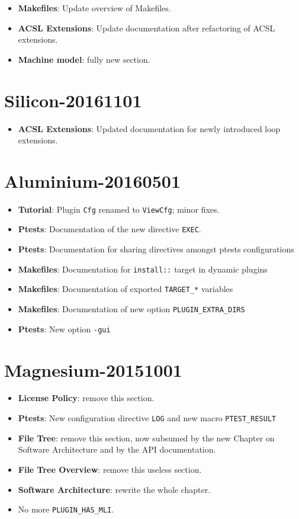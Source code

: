 \begin{itemize}
\item \textbf{Makefiles}: Update overview of Makefiles.
\item\textbf{ACSL Extensions}: Update documentation after refactoring of
ACSL extensions.
\item\textbf{Machine model}: fully new section.
\end{itemize}

\section*{Silicon-20161101}

\begin{itemize}
\item\textbf{ACSL Extensions}: Updated documentation for newly
introduced loop extensions.
\end{itemize}

\section*{Aluminium-20160501}

\begin{itemize}
\item \textbf{Tutorial}: Plugin \texttt{Cfg} renamed to \texttt{ViewCfg};
  minor fixes.
\item \textbf{Ptests}: Documentation of the new directive \texttt{EXEC}.
\item \textbf{Ptests}: Documentation for sharing directives amongst ptests
  configurations
\item \textbf{Makefiles}: Documentation for \texttt{install::} target
 in dynamic plugins
\item \textbf{Makefiles}: Documentation of exported \texttt{TARGET\_*} variables
\item \textbf{Makefiles}: Documentation of new option
\texttt{PLUGIN\_EXTRA\_DIRS}
\item \textbf{Ptests}: New option \texttt{-gui}
\end{itemize}

\section*{Magnesium-20151001}

\begin{itemize}
\item \textbf{License Policy}: remove this section.
\item \textbf{Ptests}: New configuration directive \texttt{LOG} and new macro
  \texttt{PTEST\_RESULT}
\item \textbf{File Tree}: remove this section, now subsumed by the new Chapter
  on Software Architecture and by the API documentation.
\item \textbf{File Tree Overview}: remove this useless section.
\item \textbf{Software Architecture}: rewrite the whole chapter.
\item No more \texttt{PLUGIN\_HAS\_MLI}.
\end{itemize}

